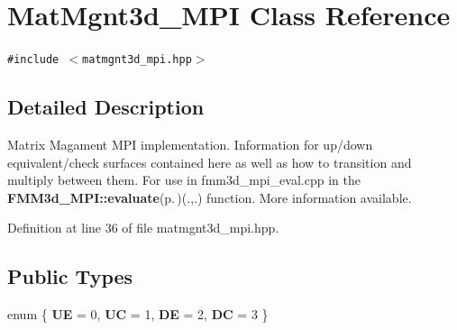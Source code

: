 \section{Mat\-Mgnt3d\_\-MPI Class Reference}
\label{classMatMgnt3d__MPI}
{\tt \#include $<$matmgnt3d\_\-mpi.hpp$>$}



\subsection{Detailed Description}
Matrix Magament MPI implementation. Information for up/down equivalent/check surfaces contained here as well as how to transition and multiply between them. For use in fmm3d\_\-mpi\_\-eval.cpp in the {\bf FMM3d\_\-MPI::evaluate}{\rm (p.\,\pageref{classFMM3d__MPI_8db45026f69e4b2b504f0c491c170d7d_8db45026f69e4b2b504f0c491c170d7d})}(.,.) function. More information available. 



Definition at line 36 of file matmgnt3d\_\-mpi.hpp.\subsection*{Public Types}
\begin{CompactItemize}
\item 
enum \{ {\bf UE} = 0, 
{\bf UC} = 1, 
{\bf DE} = 2, 
{\bf DC} = 3
 \}
\end{CompactItemize}

